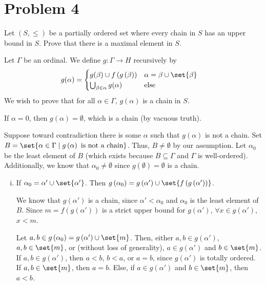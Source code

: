 \documentclass[10pt]{mypackage}
\begin{document}
\section{Problem 4}%
\begin{problem}
  Let $\left(S,\leq\right)$ be a partially ordered set where every chain in $S$ has an upper bound in $S$. Prove that there is a maximal element in $S$.

\end{problem}
\begin{solution}
  Let $\Gamma$ be an ordinal. We define $g: \Gamma \rightarrow H$ recursively by
  \begin{align*}
    g(\alpha) &= \begin{cases}
      g(\beta)\cup f\left(g\left(\beta\right)\right) & \alpha = \beta \cup \set{\beta}\\
      \bigcup_{\beta \in \alpha}g(\alpha) & $\text{else}$
    \end{cases}
  \end{align*}
  We wish to prove that for all $\alpha\in \Gamma$, $g\left(\alpha\right)$ is a chain in $S$.\newline

  If $\alpha = 0$, then $g(\alpha) = \emptyset$, which is a chain (by vacuous truth).\newline

  Suppose toward contradiction there is some $\alpha$ such that $g\left(\alpha\right)$ is not a chain. Set $B = \set{\alpha\in \Gamma\mid g\left(\alpha\right)\text{ is not a chain}}$. Thus, $B\neq\emptyset$ by our assumption. Let $\alpha_0$ be the least element of $B$ (which exists because $B\subseteq \Gamma$ and $\Gamma$ is well-ordered). Additionally, we know that $\alpha_0\neq\emptyset$ since $g\left(\emptyset\right) = \emptyset$ is a chain.
  \begin{enumerate}[(i)]
    \item If $\alpha_0 = \alpha' \cup \set{\alpha'}$. Then $g\left(\alpha_0\right) = g\left(\alpha'\right) \cup \set{f\left(g\left(\alpha'\right)\right)}$.\newline

      We know that $g\left(\alpha'\right)$ is a chain, since $\alpha' < \alpha_0$ and $\alpha_0$ is the least element of $B$. Since $m = f\left(g\left(\alpha'\right)\right)$ is a strict upper bound for $g\left(\alpha'\right)$, $\forall x\in g\left(\alpha'\right)$, $x < m$.\newline

      Let $a,b\in g\left(\alpha_0\right) = g\left(\alpha'\right)\cup \set{m}$. Then, either $a,b\in g\left(\alpha'\right)$, $a,b\in \set{m}$, or (without loss of generality), $a\in g\left(\alpha'\right)$ and $b\in \set{m}$. If $a,b\in g\left(\alpha'\right)$, then $a < b$, $b < a$, or $a = b$, since $g\left(\alpha'\right)$ is totally ordered. If $a,b\in \set{m}$, then $a=b$. Else, if $a\in g\left(\alpha'\right)$ and $b\in \set{m}$, then $a < b$.\newline


\end{enumerate}
\end{solution}
\end{document}
